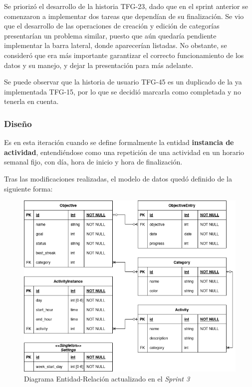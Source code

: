 \documentclass[10pt, a4paper]{aqademic}
\begin{document}
Se priorizó el desarrollo de la historia TFG-23, dado que en el sprint anterior se comenzaron a implementar dos tareas que dependían de su finalización. Se vio que el desarrollo de las operaciones de creación y edición de categorías presentarían un problema similar, puesto que aún quedaría pendiente implementar la barra lateral, donde aparecerían listadas. No obstante, se consideró que era más importante garantizar el correcto funcionamiento de los datos y su manejo, y dejar la presentación para más adelante.

Se puede observar que la historia de usuario TFG-45 es un duplicado de la ya implementada TFG-15, por lo que se decidió marcarla como completada y no tenerla en cuenta.


\subsubsection{Diseño}

Es en esta iteración cuando se define formalmente la entidad \textbf{instancia de actividad}, entendiéndose como una repetición de una actividad en un horario semanal fijo, con día, hora de inicio y hora de finalización.

Tras las modificaciones realizadas, el modelo de datos quedó definido de la siguiente forma:

\begin{figure}[h!]
	\centering
	\includegraphics[scale=0.6]{img/sprint3-modelo-datos.png}
	\caption{Diagrama Entidad-Relación actualizado en el \textit{Sprint 3}}
\end{figure}
\end{document}
